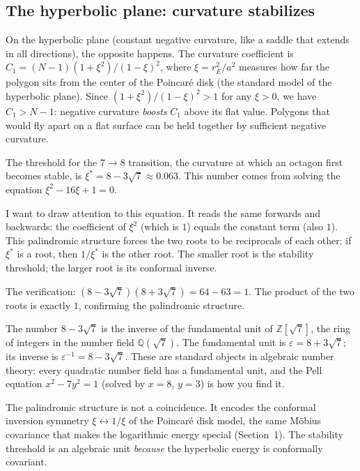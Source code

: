\subsection*{The hyperbolic plane: curvature stabilizes}

On the hyperbolic plane (constant negative curvature, like a saddle
that extends in all directions), the opposite happens. The curvature
coefficient is
$C_1 = (N-1)(1 + \xi^2)/(1-\xi)^2$,
where $\xi = r_E^2/a^2$ measures how far the polygon sits from the
center of the Poincar\'e disk (the standard model of the hyperbolic
plane). Since $(1 + \xi^2)/(1-\xi)^2 > 1$ for any $\xi > 0$, we have
$C_1 > N - 1$: negative curvature \emph{boosts} $C_1$ above its flat
value. Polygons that would fly apart on a flat surface can be held
together by sufficient negative curvature.

The threshold for the $7 \to 8$ transition, the curvature at which an
octagon first becomes stable, is
$\xi^* = 8 - 3\sqrt{7} \approx 0.063$.
This number comes from solving the equation
$\xi^2 - 16\xi + 1 = 0$.

I want to draw attention to this equation. It reads the same forwards
and backwards: the coefficient of $\xi^2$ (which is $1$) equals the
constant term (also $1$). This palindromic structure forces the two
roots to be reciprocals of each other: if $\xi^*$ is a root, then
$1/\xi^*$ is the other root. The smaller root is the stability
threshold; the larger root is its conformal inverse.

The verification: $(8 - 3\sqrt{7})(8 + 3\sqrt{7}) = 64 - 63 = 1$.
The product of the two roots is exactly $1$, confirming the
palindromic structure.

The number $8 - 3\sqrt{7}$ is the inverse of the fundamental unit
of $\mathbb{Z}[\sqrt{7}]$, the ring of integers in the number field
$\mathbb{Q}(\sqrt{7})$. The fundamental unit is
$\varepsilon = 8 + 3\sqrt{7}$; its inverse is
$\varepsilon^{-1} = 8 - 3\sqrt{7}$. These are standard objects in
algebraic number theory: every quadratic number field has a
fundamental unit, and the Pell equation $x^2 - 7y^2 = 1$ (solved by
$x = 8$, $y = 3$) is how you find it.

The palindromic structure is not a coincidence. It encodes the
conformal inversion symmetry $\xi \leftrightarrow 1/\xi$ of the
Poincar\'e disk model, the same M\"obius covariance that makes the
logarithmic energy special (Section~1). The stability threshold is an
algebraic unit \emph{because} the hyperbolic energy is conformally
covariant.

